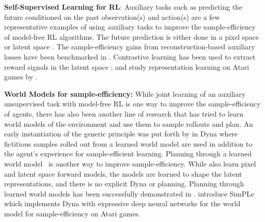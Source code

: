 \documentclass{article}
\begin{document}
{\textbf{Self-Supervised Learning for RL}}: Auxiliary tasks such as predicting the future conditioned on the past observation(s) and action(s) \cite{jaderberg2016reinforcement, shelhamer2016loss, oord2018representation, schmidhuber1990a} are a few representative examples of using auxiliary tasks to improve the sample-efficiency of model-free RL algorithms. The future prediction is either done in a pixel space \cite{jaderberg2016reinforcement} or latent space \cite{oord2018representation}. The sample-efficiency gains from reconstruction-based auxiliary losses have been benchmarked in \citet{jaderberg2016reinforcement, higgins2017darla, yarats2019improving}. Contrastive learning has been used to extract reward signals in the latent space \cite{sermanet2018time, dwibedi2018learning, warde2018unsupervised}; and study representation learning on Atari games by \citet{anand2019unsupervised}.

{\textbf{World Models for sample-efficiency:}} While joint learning of an auxiliary unsupervised task with model-free RL is one way to improve the sample-efficiency of agents, there has also been another line of research that has tried to learn world models of the environment and use them to sample rollouts and plan. An early instantiation of the generic principle was put forth by \citet{sutton1990integrated} in Dyna where fictitious samples rolled out from a learned world model are used in addition to the agent's experience for sample-efficient learning. Planning through a learned world model~\cite{srinivas2018universal} is another way to improve sample-efficiency. While \citet{jaderberg2016reinforcement, oord2018representation, lee2019stochastic} also learn pixel and latent space forward models, the models are learned to shape the latent representations, and there is no explicit Dyna or planning.
Planning through learned world models has been successfully demonstrated in \citet{ha2018world, hafner2018learning, hafner2019dream}. \citet{kaiser2019model} introduce SimPLe which implements Dyna with expressive deep neural networks for the world model for sample-efficiency on Atari games.
\end{document}
